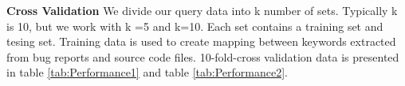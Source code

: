 \documentclass[conference]{IEEEtran}
\begin{document}
\textbf{Cross Validation}
We divide our query data into k number of sets. Typically k is 10, but we work with k =5 and k=10. Each set contains a training set and tesing set. Training data is used to create mapping between keywords extracted from bug reports and source code files. 10-fold-cross validation data is presented in table \ref{tab:Performance1} and table \ref{tab:Performance2}.
\begin{table}[htbp]
\caption{Performance of Bugloactor and proposed technique (rVSM+Simi+Co-Occerence)}
\label{tab:Performance1}
\centering
{}
\end{table}
\end{document}

